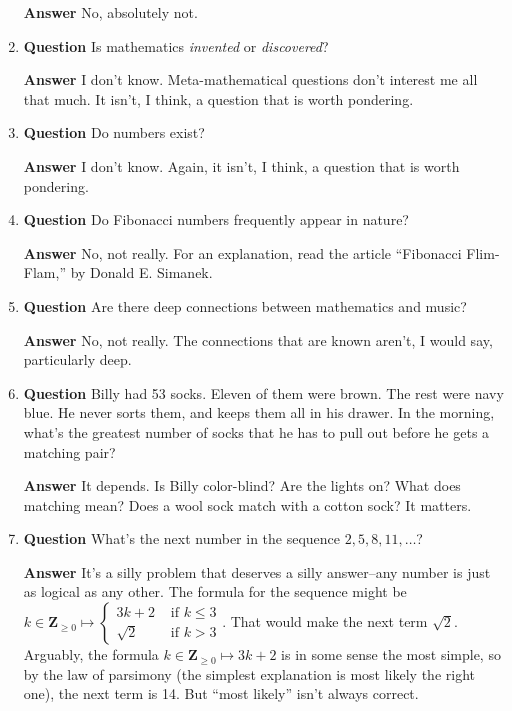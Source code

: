 \documentclass[11pt]{article}
\newcounter{ex}\setcounter{ex}{0}
\begin{document}
\begin{enumerate}
\textbf{Answer} No, absolutely not.

\item  \textbf{Question}  Is mathematics \emph{invented} or \emph{discovered}?

 \textbf{Answer} I don't know. Meta-mathematical questions don't interest me all that much. 
It isn't, I think, a question that is worth pondering.

\item  \textbf{Question} Do numbers exist?

  \textbf{Answer} I don't know. Again, it isn't, I think, a question that is worth pondering.

\item  \textbf{Question} Do Fibonacci numbers frequently appear in nature?

\textbf{Answer}  No, not really.  For an explanation, read the article ``Fibonacci Flim-Flam,'' by Donald E. Simanek.

\item  \textbf{Question} Are there deep connections between mathematics and music? 

  \textbf{Answer}  No, not really. The connections that are known aren't, I would say, particularly deep.

\item  \textbf{Question}  Billy had 53 socks.  Eleven of them were brown.  The rest were navy blue.  He never sorts them, and keeps them all in his drawer.  In the morning, what's the greatest number of socks that he has to pull out before he gets a matching pair?

  \textbf{Answer} It depends. Is Billy color-blind?  Are the lights on? What does matching mean? Does a wool sock match with a cotton sock? It matters.

\item  \textbf{Question} What's the next number in the sequence  \(2,5,8,11, \dots \)?

  \textbf{Answer}  It's a silly problem that deserves a silly answer--any number is just as logical as any other. 
The formula for the sequence might be \(k \in \mathbf{Z}_{\geq 0} \mapsto \begin{cases} 3 k +2 & \mbox{ if } k \leq 3
 \\ \sqrt{2} & \mbox{ if } k >  3 \end{cases} \). That would make the next term \(\sqrt{2} \). 
 Arguably, the formula  \(k \in \mathbf{Z}_{\geq 0}  \mapsto 3 k +2 \) is in some 
 sense the most simple, so by the law of parsimony 
 (the simplest explanation is most likely the right one), the next 
 term is 14. But ``most likely'' isn't always correct.


\end{enumerate}
\end{document}
